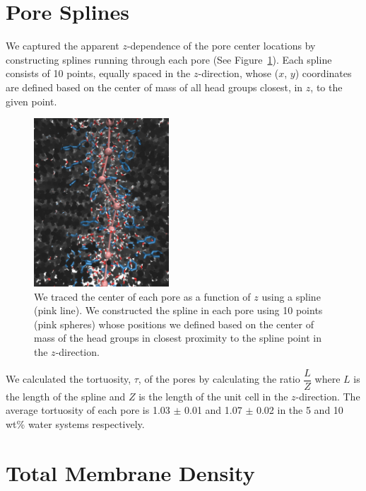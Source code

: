 \documentclass{article}
\begin{document}
  \clearpage
  \section{Pore Splines}\label{section:splines}
  
  We captured the apparent $z$-dependence of the pore center locations by
  constructing splines running through each pore (See Figure~\ref{fig:spline}).
  Each spline consists of 10 points, equally spaced in the $z$-direction, whose
  ($x$, $y$) coordinates are defined based on the center of mass of all head
  groups closest, in $z$, to the given point.
  
  \begin{figure}[!htb]
  \centering
  \includegraphics[width=0.45\textwidth]{spline.pdf}
  \caption{We traced the center of each pore as a function of $z$ using a spline (pink
  line). We constructed the spline in each pore using 10 points (pink spheres) whose
  positions we defined based on the center of mass of the head groups in closest proximity
  to the spline point in the $z$-direction.}\label{fig:spline}
  \end{figure}
  
  We calculated the tortuosity, $\tau$, of the pores by calculating the 
  ratio $\dfrac{L}{Z}$ where $L$ is the length of the spline and $Z$ is 
  the length of the unit cell in the $z$-direction. The average tortuosity
  of each pore is 1.03 $\pm$ 0.01 and 1.07 $\pm$ 0.02 in the 5 and 10 wt\%
  water systems respectively.
  
  \clearpage
  \section{Total Membrane Density}\label{section:total_density}
  
\end{document}
